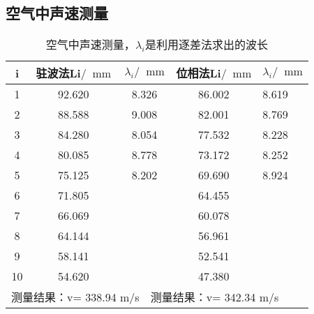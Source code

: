 \documentclass[11pt]{article}
\newcommand*{\unit}[1]{\mathop{}\!\mathrm{#1}}
\newcommand{\mm}{\unit{mm}}
\begin{document}
\subsection{空气中声速测量}
\begin{table}[H]
	\centering
	\begin{tabular}{|ccclcl|}
		\hline
		\multicolumn{1}{|c|}{i}  & \multicolumn{1}{c|}{驻波法Li\(/\mm\)} & \multicolumn{2}{c|}{\(\lambda_i/\mm\)}                  & \multicolumn{1}{c|}{位相法Li\(/\mm\)} & \multicolumn{1}{c|}{\(\lambda_i/\mm\)} \\ \hline
		\multicolumn{1}{|c|}{1}  & \multicolumn{1}{c|}{92.620}    & \multicolumn{2}{c|}{8.326}             & \multicolumn{1}{c|}{86.002}    & 8.619                 \\ \hline
		\multicolumn{1}{|c|}{2}  & \multicolumn{1}{c|}{88.588}    & \multicolumn{2}{c|}{9.008}             & \multicolumn{1}{c|}{82.001}    & 8.769                 \\ \hline
		\multicolumn{1}{|c|}{3}  & \multicolumn{1}{c|}{84.280}    & \multicolumn{2}{c|}{8.054}             & \multicolumn{1}{c|}{77.532}    & 8.228                 \\ \hline
		\multicolumn{1}{|c|}{4}  & \multicolumn{1}{c|}{80.085}    & \multicolumn{2}{c|}{8.778}             & \multicolumn{1}{c|}{73.172}    & 8.252                 \\ \hline
		\multicolumn{1}{|c|}{5}  & \multicolumn{1}{c|}{75.125}    & \multicolumn{2}{c|}{8.202}             & \multicolumn{1}{c|}{69.690}    & 8.924                 \\ \hline
		\multicolumn{1}{|c|}{6}  & \multicolumn{1}{c|}{71.805}    & \multicolumn{2}{c|}{\multirow{5}{*}{}} & \multicolumn{1}{c|}{64.455}    & \multirow{5}{*}{}     \\ \cline{1-2} \cline{5-5}
		\multicolumn{1}{|c|}{7}  & \multicolumn{1}{c|}{66.069}    & \multicolumn{2}{c|}{}                  & \multicolumn{1}{c|}{60.078}    &                       \\ \cline{1-2} \cline{5-5}
		\multicolumn{1}{|c|}{8}  & \multicolumn{1}{c|}{64.144}    & \multicolumn{2}{c|}{}                  & \multicolumn{1}{c|}{56.961}    &                       \\ \cline{1-2} \cline{5-5}
		\multicolumn{1}{|c|}{9}  & \multicolumn{1}{c|}{58.141}    & \multicolumn{2}{c|}{}                  & \multicolumn{1}{c|}{52.541}    &                       \\ \cline{1-2} \cline{5-5}
		\multicolumn{1}{|c|}{10} & \multicolumn{1}{c|}{54.620}    & \multicolumn{2}{c|}{}                  & \multicolumn{1}{c|}{47.380}    &                       \\ \hline
		\multicolumn{3}{|c|}{测量结果：v=      338.94       m/s}                            & \multicolumn{3}{l|}{测量结果：v=      342.34       m/s}                         \\ \hline
	\end{tabular}
	\caption{空气中声速测量，\(\lambda_i\)是利用逐差法求出的波长}
	\label{belocity in air}
\end{table}
\end{document}

